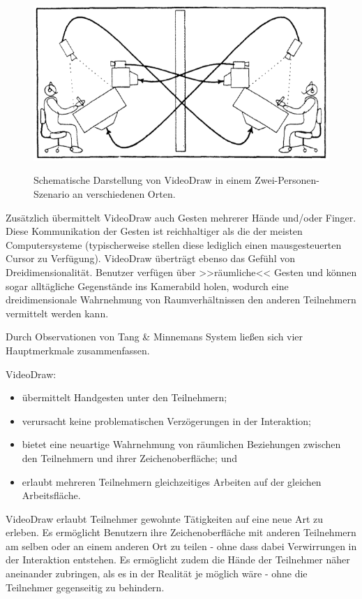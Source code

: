 \begin{figure}[bth]
	{\includegraphics[width=\linewidth]{gfx/tangVideoDraw}}
	\caption[VideoDraw \newline \citep{Tang:1991p28}]{Schematische Darstellung von VideoDraw in einem Zwei-Personen-Szenario an verschiedenen Orten.}
	\label{fig:tangVideoDraw}
\end{figure}

\newpage Zusätzlich übermittelt VideoDraw auch Gesten mehrerer Hände und/oder Finger. Diese Kommunikation der Gesten ist reichhaltiger als die der meisten Computersysteme (typischerweise stellen diese lediglich einen mausgesteuerten Cursor zu Verfügung). VideoDraw überträgt ebenso das Gefühl von Dreidimensionalität.
Benutzer verfügen über >>räumliche<< Gesten und können sogar alltägliche Gegenstände ins Kamerabild holen, wodurch eine dreidimensionale Wahrnehmung von Raumverhältnissen den anderen Teilnehmern vermittelt werden kann.

\medskip Durch Observationen von Tang \& Minnemans System ließen sich vier Hauptmerkmale zusammenfassen.

\medskip VideoDraw:
\begin{itemize}
	\item übermittelt Handgesten unter den Teilnehmern;
	\item verursacht keine problematischen Verzögerungen in der Interaktion;
	\item bietet eine neuartige Wahrnehmung von räumlichen Beziehungen zwischen den Teilnehmern und ihrer Zeichenoberfläche; und
	\item erlaubt mehreren Teilnehmern gleichzeitiges Arbeiten auf der gleichen Arbeitsfläche.
\end{itemize}

VideoDraw erlaubt Teilnehmer gewohnte Tätigkeiten auf eine neue Art zu erleben. Es ermöglicht Benutzern ihre Zeichenoberfläche mit anderen Teilnehmern am selben oder an einem anderen Ort zu teilen - ohne dass dabei Verwirrungen in der Interaktion entstehen. Es ermöglicht zudem die Hände der Teilnehmer näher aneinander zubringen, als es in der Realität je möglich wäre - ohne die Teilnehmer gegenseitig zu behindern. \citep{Tang:1991p28}
\clearpage
